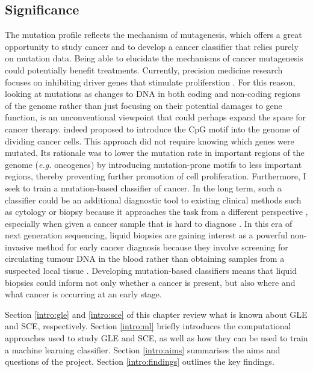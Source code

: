 \subsection{Significance}\label{intro:significance}
The mutation profile reflects the mechanism of mutagenesis, which offers a great opportunity to study cancer and to develop a cancer classifier that relies purely on mutation data. Being able to elucidate the mechanisms of cancer mutagenesis could potentially benefit treatments. Currently, precision medicine research focuses on inhibiting driver genes that stimulate proliferstion \citep[\textit{i.e.} oncogenes;][]{Mukherjee2019Genomics-GuidedCancer}. For this reason, looking at mutations as changes to DNA in both coding and non-coding regions of the genome rather than just focusing on their potential damages to gene function, is an unconventional viewpoint that could perhaps expand the space for cancer therapy. \citet{Chowdhury2018PresenceNucleotides} indeed proposed to introduce the CpG motif into the genome of dividing cancer cells. This approach did not require knowing which genes were mutated. Its rationale was to lower the mutation rate in important regions of the genome (\textit{e.g.} oncogenes) by introducing mutation-prone motifs to less important regions, thereby preventing further promotion of cell proliferation. Furthermore, I seek to train a mutation-based \gls{classifier} of cancer. In the long term, such a classifier could be an additional diagnostic tool to existing clinical methods such as cytology or biopsy because it approaches the task from a different perspective \citep{Stone1995Biopsy:Pitfalls}, especially when given a cancer sample that is hard to diagnose \citep{Sheahan1993MetastaticStatus}. In this era of next generation sequencing, liquid biopsies are gaining interest as a powerful non-invasive method for early cancer diagnosis because they involve screening for circulating tumour DNA in the blood rather than obtaining samples from a suspected local tissue \citep{Chen2019Next-generationDetection}. Developing mutation-based classifiers means that liquid biopsies could inform not only whether a cancer is present, but also where and what cancer is occurring at an early stage.

Section \ref{intro:gle} and \ref{intro:sce} of this chapter review what is known about GLE and SCE, respectively. Section \ref{intro:ml} briefly introduces the computational approaches used to study GLE and SCE, as well as how they can be used to train a machine learning classifier. Section \ref{intro:aims} summarises the aims and questions of the project. Section \ref{intro:findings} outlines the key findings.

